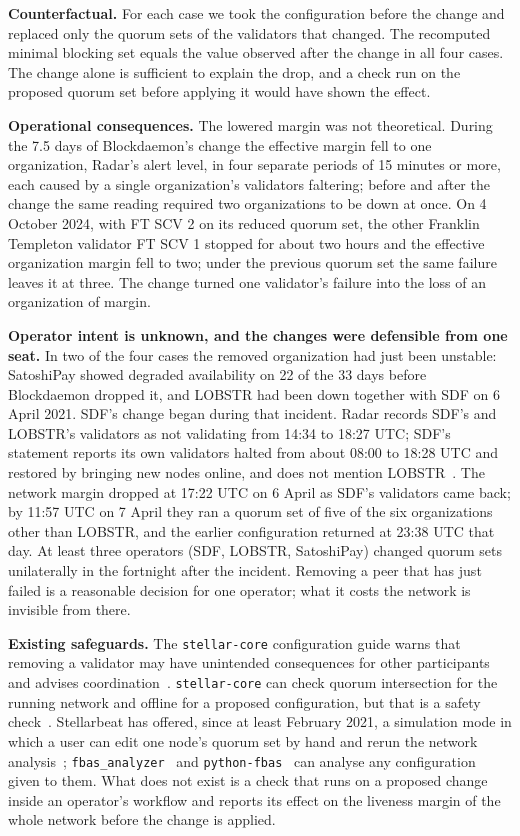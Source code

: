 \documentclass[11pt,a4paper]{article}
\newcommand{\toolname}[1]{\texttt{#1}}
\begin{document}
\textbf{Counterfactual.} For each case we took the configuration before the change and replaced only the quorum sets of the validators that changed. The recomputed minimal blocking set equals the value observed after the change in all four cases. The change alone is sufficient to explain the drop, and a check run on the proposed quorum set before applying it would have shown the effect.

\textbf{Operational consequences.} The lowered margin was not theoretical. During the 7.5 days of Blockdaemon's change the effective margin fell to one organization, Radar's alert level, in four separate periods of 15 minutes or more, each caused by a single organization's validators faltering; before and after the change the same reading required two organizations to be down at once. On 4 October 2024, with FT SCV 2 on its reduced quorum set, the other Franklin Templeton validator FT SCV 1 stopped for about two hours and the effective organization margin fell to two; under the previous quorum set the same failure leaves it at three. The change turned one validator's failure into the loss of an organization of margin.

\textbf{Operator intent is unknown, and the changes were defensible from one seat.} In two of the four cases the removed organization had just been unstable: SatoshiPay showed degraded availability on 22 of the 33 days before Blockdaemon dropped it, and LOBSTR had been down together with SDF on 6 April 2021. SDF's change began during that incident. Radar records SDF's and LOBSTR's validators as not validating from 14:34 to 18:27 UTC; SDF's statement reports its own validators halted from about 08:00 to 18:28 UTC and restored by bringing new nodes online, and does not mention LOBSTR~\cite{sdf2021}. The network margin dropped at 17:22 UTC on 6 April as SDF's validators came back; by 11:57 UTC on 7 April they ran a quorum set of five of the six organizations other than LOBSTR, and the earlier configuration returned at 23:38 UTC that day. At least three operators (SDF, LOBSTR, SatoshiPay) changed quorum sets unilaterally in the fortnight after the incident. Removing a peer that has just failed is a reasonable decision for one operator; what it costs the network is invisible from there.

\textbf{Existing safeguards.} The \toolname{stellar-core} configuration guide warns that removing a validator may have unintended consequences for other participants and advises coordination~\cite{configuring}. \toolname{stellar-core} can check quorum intersection for the running network and offline for a proposed configuration, but that is a safety check~\cite{monitoring,corecfg}. Stellarbeat has offered, since at least February 2021, a simulation mode in which a user can edit one node's quorum set by hand and rerun the network analysis~\cite{stellarbeat2021}; \toolname{fbas\_analyzer}~\cite{florian2022} and \toolname{python-fbas}~\cite{pythonfbas} can analyse any configuration given to them. What does not exist is a check that runs on a proposed change inside an operator's workflow and reports its effect on the liveness margin of the whole network before the change is applied.
\end{document}
